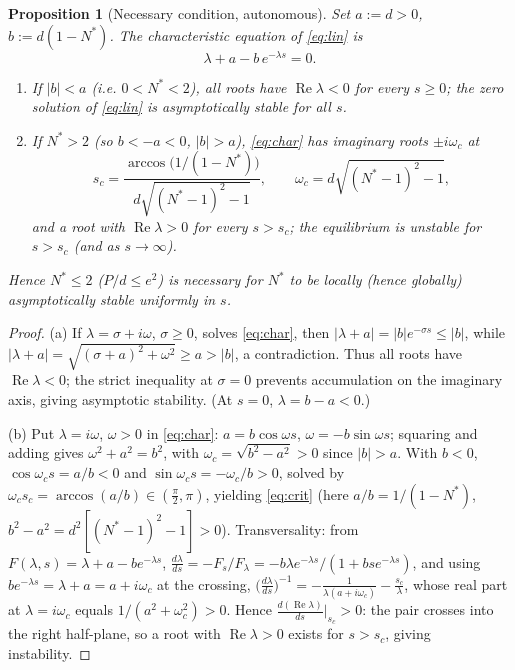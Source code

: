 \documentclass[12pt]{article}
\newtheorem{proposition}{Proposition}
\theoremstyle{definition}
\begin{document}
\begin{proposition}[Necessary condition, autonomous]\label{prop:nec-auto}
Set $a:=d>0$, $b:=d(1-N^*)$. The characteristic equation of \eqref{eq:lin} is
\begin{equation}\label{eq:char}
  \lambda+a-b\,e^{-\lambda s}=0 .
\end{equation}
\begin{enumerate}
\item[\rm(a)] If $|b|<a$ (i.e. $0<N^*<2$), all roots have
$\operatorname{Re}\lambda<0$ for every $s\ge0$; the zero solution of
\eqref{eq:lin} is asymptotically stable for all $s$.
\item[\rm(b)] If $N^*>2$ (so $b<-a<0$, $|b|>a$), \eqref{eq:char} has imaginary
roots $\pm i\omega_c$ at
\begin{equation}\label{eq:crit}
  s_c=\frac{\arccos\!\bigl(1/(1-N^*)\bigr)}{d\sqrt{(N^*-1)^2-1}},\qquad
  \omega_c=d\sqrt{(N^*-1)^2-1},
\end{equation}
and a root with $\operatorname{Re}\lambda>0$ for every $s>s_c$; the equilibrium
is unstable for $s>s_c$ (and as $s\to\infty$).
\end{enumerate}
Hence $N^*\le2$ ($P/d\le e^2$) is \emph{necessary} for $N^*$ to be locally
(hence globally) asymptotically stable uniformly in $s$.
\end{proposition}

\begin{proof}
(a) If $\lambda=\sigma+i\omega$, $\sigma\ge0$, solves \eqref{eq:char}, then
$|\lambda+a|=|b|e^{-\sigma s}\le|b|$, while
$|\lambda+a|=\sqrt{(\sigma+a)^2+\omega^2}\ge a>|b|$, a contradiction. Thus all
roots have $\operatorname{Re}\lambda<0$; the strict inequality at $\sigma=0$
prevents accumulation on the imaginary axis, giving asymptotic stability. (At
$s=0$, $\lambda=b-a<0$.)

(b) Put $\lambda=i\omega$, $\omega>0$ in \eqref{eq:char}:
$a=b\cos\omega s$, $\omega=-b\sin\omega s$; squaring and adding gives
$\omega^2+a^2=b^2$, with $\omega_c=\sqrt{b^2-a^2}>0$ since $|b|>a$. With $b<0$,
$\cos\omega_c s=a/b<0$ and $\sin\omega_c s=-\omega_c/b>0$, solved by
$\omega_c s_c=\arccos(a/b)\in(\tfrac\pi2,\pi)$, yielding \eqref{eq:crit} (here
$a/b=1/(1-N^*)$, $b^2-a^2=d^2[(N^*-1)^2-1]>0$). Transversality: from
$F(\lambda,s)=\lambda+a-be^{-\lambda s}$,
$\frac{d\lambda}{ds}=-F_s/F_\lambda
=-b\lambda e^{-\lambda s}/(1+bse^{-\lambda s})$, and using
$be^{-\lambda s}=\lambda+a=a+i\omega_c$ at the crossing,
$\bigl(\tfrac{d\lambda}{ds}\bigr)^{-1}
=-\tfrac{1}{\lambda(a+i\omega_c)}-\tfrac{s_c}{\lambda}$, whose real part at
$\lambda=i\omega_c$ equals $1/(a^2+\omega_c^2)>0$. Hence
$\frac{d(\operatorname{Re}\lambda)}{ds}\big|_{s_c}>0$: the pair crosses into the
right half-plane, so a root with $\operatorname{Re}\lambda>0$ exists for
$s>s_c$, giving instability.
\end{proof}
\end{document}
